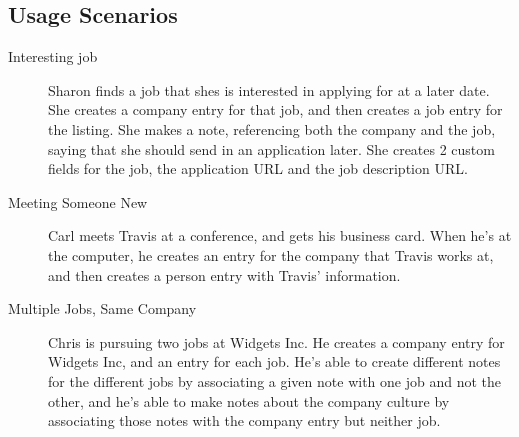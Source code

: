 \documentclass[12pt, letter]{article}
\begin{document}
\subsection{Usage Scenarios}
\begin{description}
\item[Interesting job] Sharon finds a job that shes is interested in applying for at a later date.  She creates a company entry for that job, and then creates a job entry for the listing.  She makes a note, referencing both the company and the job, saying that she should send in an application later.  She creates 2 custom fields for the job, the application URL and the job description URL.
\item[Meeting Someone New] Carl meets Travis at a conference, and gets his business card.  When he's at the computer, he creates an entry for the company that Travis works at, and then creates a person entry with Travis' information.
\item[Multiple Jobs, Same Company] Chris is pursuing two jobs at Widgets Inc.  He creates a company entry for Widgets Inc, and an entry for each job.  He's able to create different notes for the different jobs by associating a given note with one job and not the other, and he's able to make notes about the company culture by associating those notes with the company entry but neither job.
\end{description}
\end{document}
